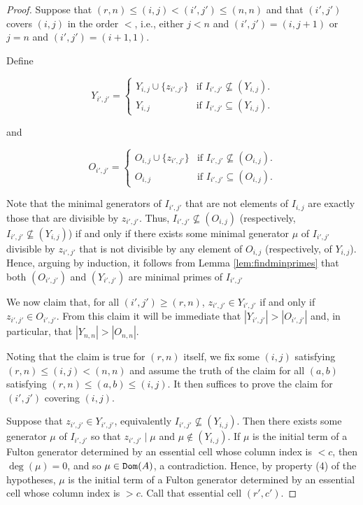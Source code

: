 \documentclass[12 pt]{amsart}
\DeclareMathOperator{\Dom}{{\tt Dom}}
\theoremstyle{plain}
\theoremstyle{definition}
\theoremstyle{remark}
\begin{document}
{\begin{proof}
Suppose that $(r,n)\leq (i,j) <(i',j')\leq (n,n)$ and that $(i',j')$ covers $(i,j)$ in the order $<$, i.e., either $j<n$ and $(i',j') = (i,j+1)$ or $j = n$ and $(i',j') = (i+1,1)$.

Define

\begin{equation*}
Y_{i',j'} =
    \begin{cases}
        Y_{i,j} \cup \{z_{i',j'}\} & \text{if } I_{i',j'} \not\subseteq (Y_{i,j}).\\
        Y_{i,j} & \text{if } I_{i',j'} \subseteq (Y_{i,j}).
    \end{cases}
\end{equation*}

and 

\begin{equation*}
O_{i',j'} =
    \begin{cases}
        O_{i,j} \cup \{z_{i',j'}\} & \text{if } I_{i',j'} \not\subseteq (O_{i,j}).\\
        O_{i,j} & \text{if } I_{i',j'} \subseteq (O_{i,j}).
    \end{cases}
\end{equation*}

Note that the minimal generators of $I_{i',j'}$ that are not elements of $I_{i,j}$ are exactly those that are divisible by $z_{i',j'}$.  Thus, $I_{i',j'} \not\subseteq (O_{i,j})$ (respectively, $I_{i',j'} \not\subseteq (Y_{i,j})$) if and only if there exists some minimal generator $\mu$ of $I_{i',j'}$ divisible by $z_{i',j'}$ that is not divisible by any element of $O_{i,j}$ (respectively, of $Y_{i,j}$).  Hence, arguing by induction, it follows from Lemma \ref{lem:findminprimes} that both $(O_{i',j'})$ and $(Y_{i',j'})$ are minimal primes of $I_{i',j'}$

We now claim that, for all $(i',j')\geq (r,n)$, $z_{i',j'} \in Y_{i',j'}$ if and only if $z_{i',j'} \in O_{i',j'}$. From this claim it will be immediate that $|Y_{i',j'}|>|O_{i',j'}|$ and, in particular, that $|Y_{n,n}|>|O_{n,n}|$.

Noting that the claim is true for $(r,n)$ itself, we fix some $(i,j)$ satisfying $(r,n) \leq (i,j) < (n,n)$ and assume the truth of the claim for all $(a,b)$ satisfying $(r,n) \leq (a,b) \leq (i,j)$. It then suffices to prove the claim for $(i',j')$ covering $(i,j)$.

Suppose that $z_{i',j'} \in Y_{i',j'}$, equivalently $I_{i',j'} \not\subseteq (Y_{i,j})$. Then there exists some generator $\mu$ of $I_{i',j'}$ so that $z_{i',j'} \mid \mu$ and $\mu \notin (Y_{i,j})$. If $\mu$ is the initial term of a Fulton generator determined by an essential cell whose column index is $<c$, then $\deg(\mu) = 0$, and so $\mu \in \Dom(A)$, a contradiction.  Hence, by property (4) of the hypotheses, $\mu$ is the initial term of a Fulton generator determined by an essential cell whose column index is $>c$. Call that essential cell $(r',c')$. 


\end{proof}}
\end{document}
